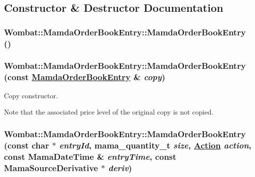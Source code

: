 \subsection{Constructor \& Destructor Documentation}
\hypertarget{classWombat_1_1MamdaOrderBookEntry_57528ab4a86fde1ec6f8537692018081}{
\subsubsection[MamdaOrderBookEntry]{\setlength{\rightskip}{0pt plus 5cm}Wombat::Mamda\-Order\-Book\-Entry::Mamda\-Order\-Book\-Entry ()}}
\label{classWombat_1_1MamdaOrderBookEntry_57528ab4a86fde1ec6f8537692018081}


\hypertarget{classWombat_1_1MamdaOrderBookEntry_129d31bda758f3a6bccd78c21cf7e8f0}{
\subsubsection[MamdaOrderBookEntry]{\setlength{\rightskip}{0pt plus 5cm}Wombat::Mamda\-Order\-Book\-Entry::Mamda\-Order\-Book\-Entry (const \hyperlink{classWombat_1_1MamdaOrderBookEntry}{Mamda\-Order\-Book\-Entry} \& {\em copy})}}
\label{classWombat_1_1MamdaOrderBookEntry_129d31bda758f3a6bccd78c21cf7e8f0}


Copy constructor. 

Note that the associated price level of the original copy is not copied. \hypertarget{classWombat_1_1MamdaOrderBookEntry_2a7ac7cb5c1c23187f96d7b62f852d67}{
\subsubsection[MamdaOrderBookEntry]{\setlength{\rightskip}{0pt plus 5cm}Wombat::Mamda\-Order\-Book\-Entry::Mamda\-Order\-Book\-Entry (const char $\ast$ {\em entry\-Id}, mama\_\-quantity\_\-t {\em size}, \hyperlink{classWombat_1_1MamdaOrderBookEntry_fc6cb1d67c7601d093a36f59cf9bcef4}{Action} {\em action}, const Mama\-Date\-Time \& {\em entry\-Time}, const Mama\-Source\-Derivative $\ast$ {\em deriv})}}
\label{classWombat_1_1MamdaOrderBookEntry_2a7ac7cb5c1c23187f96d7b62f852d67}


